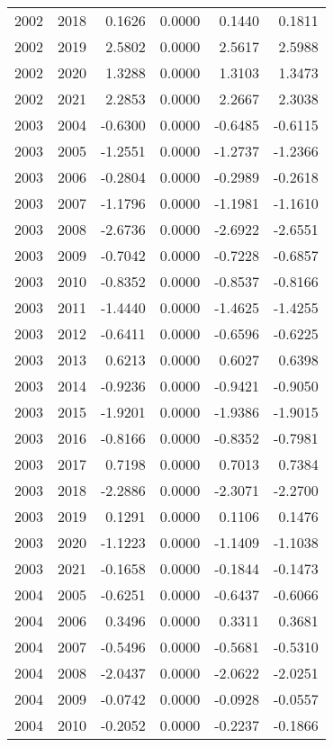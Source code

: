 \begin{tabular}{llrrrr}
2002 & 2018 & 0.1626 & 0.0000 & 0.1440 & 0.1811 \\
2002 & 2019 & 2.5802 & 0.0000 & 2.5617 & 2.5988 \\
2002 & 2020 & 1.3288 & 0.0000 & 1.3103 & 1.3473 \\
2002 & 2021 & 2.2853 & 0.0000 & 2.2667 & 2.3038 \\
2003 & 2004 & -0.6300 & 0.0000 & -0.6485 & -0.6115 \\
2003 & 2005 & -1.2551 & 0.0000 & -1.2737 & -1.2366 \\
2003 & 2006 & -0.2804 & 0.0000 & -0.2989 & -0.2618 \\
2003 & 2007 & -1.1796 & 0.0000 & -1.1981 & -1.1610 \\
2003 & 2008 & -2.6736 & 0.0000 & -2.6922 & -2.6551 \\
2003 & 2009 & -0.7042 & 0.0000 & -0.7228 & -0.6857 \\
2003 & 2010 & -0.8352 & 0.0000 & -0.8537 & -0.8166 \\
2003 & 2011 & -1.4440 & 0.0000 & -1.4625 & -1.4255 \\
2003 & 2012 & -0.6411 & 0.0000 & -0.6596 & -0.6225 \\
2003 & 2013 & 0.6213 & 0.0000 & 0.6027 & 0.6398 \\
2003 & 2014 & -0.9236 & 0.0000 & -0.9421 & -0.9050 \\
2003 & 2015 & -1.9201 & 0.0000 & -1.9386 & -1.9015 \\
2003 & 2016 & -0.8166 & 0.0000 & -0.8352 & -0.7981 \\
2003 & 2017 & 0.7198 & 0.0000 & 0.7013 & 0.7384 \\
2003 & 2018 & -2.2886 & 0.0000 & -2.3071 & -2.2700 \\
2003 & 2019 & 0.1291 & 0.0000 & 0.1106 & 0.1476 \\
2003 & 2020 & -1.1223 & 0.0000 & -1.1409 & -1.1038 \\
2003 & 2021 & -0.1658 & 0.0000 & -0.1844 & -0.1473 \\
2004 & 2005 & -0.6251 & 0.0000 & -0.6437 & -0.6066 \\
2004 & 2006 & 0.3496 & 0.0000 & 0.3311 & 0.3681 \\
2004 & 2007 & -0.5496 & 0.0000 & -0.5681 & -0.5310 \\
2004 & 2008 & -2.0437 & 0.0000 & -2.0622 & -2.0251 \\
2004 & 2009 & -0.0742 & 0.0000 & -0.0928 & -0.0557 \\
2004 & 2010 & -0.2052 & 0.0000 & -0.2237 & -0.1866 \\

\end{tabular}
